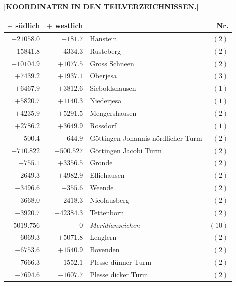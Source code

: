 \clearpage
{}
\begin{center}\textbf{[KOORDINATEN IN DEN TEILVERZEICHNISSEN.]}\end{center}
\begin{center}\begingroup\fontsize{8}{9}\selectfont
\setlength{\tabcolsep}{4pt}
\begin{tabular}{r|r|p{170pt}|r}\hline
\(+\) südlich&\(+\) westlich&&Nr.\\\hline
\(+21058.0\)&\(+181.7\)&Hanstein&\((2)\)\\
\(+15841.8\)&\(-4334.3\)&Rusteberg&\((2)\)\\
\(+10104.9\)&\(+1077.5\)&Gross Schneen&\((2)\)\\
\(+7439.2\)&\(+1937.1\)&Oberjesa&\((3)\)\\
\(+6467.9\)&\(+3812.6\)&Sieboldshausen&\((1)\)\\
\(+5820.7\)&\(+1140.3\)&Niederjesa&\((1)\)\\
\(+4235.9\)&\(+5291.5\)&Mengershausen&\((2)\)\\
\(+2786.2\)&\(+3649.9\)&Rossdorf&\((1)\)\\
\(-500.4\)&\(+644.9\)&Göttingen Johannis nördlicher Turm&\((2)\)\\
\(-710.822\)&\(+500.527\)&Göttingen Jacobi Turm&\((2)\)\\
\(-755.1\)&\(+3356.5\)&Gronde&\((2)\)\\
\(-2649.3\)&\(+4982.9\)&Elliehausen&\((2)\)\\
\(-3496.6\)&\(+355.6\)&Weende&\((2)\)\\
\(-3668.0\)&\(-2418.3\)&Nicolausberg&\((2)\)\\
\(-3920.7\)&\(-42384.3\)&Tettenborn&\((2)\)\\
\(-5019.756\)&\(-0\)&\textit{Meridianzeichen}&\((10)\)\\
\(-6069.3\)&\(+5071.8\)&Lenglern&\((2)\)\\
\(-6753.6\)&\(+1540.9\)&Bovenden&\((2)\)\\
\(-7666.3\)&\(-1552.1\)&Plesse dünner Turm&\((2)\)\\
\(-7694.6\)&\(-1607.7\)&Plesse dicker Turm&\((2)\)\\
\hline\end{tabular}\endgroup\end{center}
\clearpage
